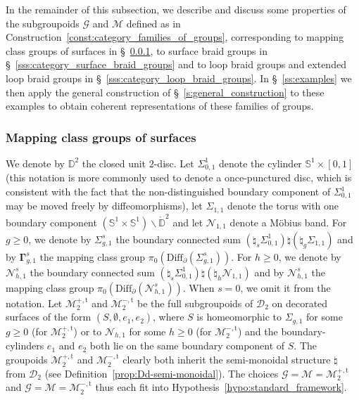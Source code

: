 \documentclass[AHL,Unicode,published]{cedram}
\newcommand{\Diff}{\mathrm{Diff}}
\newcommand{\Int}{\mathring}
\newcommand{\mt}{\mathrm{t}}
\newcommand{\MCGo}{\mathbf{\Gamma}}
\newcommand{\MCGno}{\boldsymbol{\mathcal{N}}}
\newcommand{\N}{\mathscr{N}}
\newcommand{\cD}{\mathcal{D}}
\newcommand{\cG}{\mathcal{G}}
\newcommand{\cM}{\mathcal{M}}
\newcommand{\bD}{\mathbb{D}}
\newcommand{\bS}{\mathbb{S}}
\renewcommand{\geq}{\geqslant}
\begin{document}
In the remainder of this subsection, we describe and discuss some properties of the subgroupoids $\cG$ and $\cM$ defined as in Construction~\ref{const:category_families_of_groups}, corresponding to mapping class groups of surfaces in \S~\ref{sss:category_mcg}, to surface braid groups in \S~\ref{sss:category_surface_braid_groups} and to loop braid groups and extended loop braid groups in \S~\ref{sss:category_loop_braid_groups}. In \S~\ref{ss:examples} we then apply the general construction of \S~\ref{s:general_construction} to these examples to obtain coherent representations of these families of groups.


\subsubsection{Mapping class groups of surfaces}\label{sss:category_mcg}

We denote by $\bD^{2}$ the closed unit $2$-disc. Let $\Sigma_{0,1}^{1}$ denote the cylinder $\bS^{1}\times[0,1]$ (this notation is more commonly used to denote a once-punctured disc, which is consistent with the fact that the non-distinguished boundary component of $\Sigma_{0,1}^{1}$ may be moved freely by diffeomorphisms), let $\Sigma_{1,1}$ denote the torus with one boundary component $(\bS^{1}\times\bS^{1}) \smallsetminus\Int{\bD}^{2}$ and let $\N{}_{1,1}$ denote a M\"obius band. For $g\geq 0$, we denote by $\Sigma_{g,1}^{s}$ the boundary connected sum $(\natural_{s}\Sigma_{0,1}^{1})\natural(\natural_{g}\Sigma_{1,1})$ and by $\MCGo_{g,1}^{s}$ the mapping class group $\pi_{0}(\Diff_{\partial}(\Sigma_{g,1}^{s}))$. For $h\geq 0$, we denote by $\N_{h,1}^{s}$ the boundary connected sum $(\natural_{s}\Sigma_{0,1}^{1})\natural(\natural_{h}\N{}_{1,1})$ and by $\MCGno_{h,1}^{s}$ the mapping class group $\pi_{0}(\Diff_{\partial}(\N_{h,1}^{s}))$. When $s=0$, we omit it from the notation. Let $\cM_{2}^{+,\mt}$ and $\cM_{2}^{-,\mt}$ be the full subgroupoids of $\cD_{2}$ on decorated surfaces of the form $(S,\emptyset,e_{1},e_{2})$, where $S$ is homeomorphic to $\Sigma_{g,1}$ for some $g\geq 0$ (for $\cM_{2}^{+,\mt}$) or to $\N_{h,1}$ for some $h\geq 0$ (for $\cM_{2}^{-,\mt}$) and the boundary-cylinders $e_{1}$ and $e_{2}$ both lie on the same boundary component of $S$. The groupoids $\cM_{2}^{+,\mt}$ and $\cM_{2}^{-,\mt}$ clearly both inherit the semi-monoidal structure $\natural$ from $\cD_{2}$ (see Definition~\ref{prop:Dd-semi-monoidal}). The choices $\cG = \cM = \cM_{2}^{+,\mt}$ and $\cG = \cM = \cM_{2}^{-,\mt}$ thus each fit into Hypothesis~\ref{hypo:standard_framework}.
\end{document}
